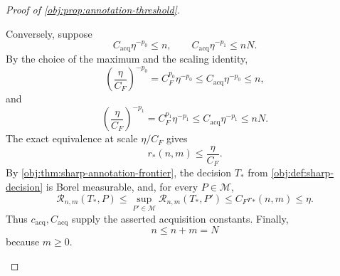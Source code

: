 \begin{proof}[Proof of \cref{obj:prop:annotation-threshold}]
\begin{enumerate}
Conversely, suppose
\[
C_{\mathrm{acq}}\eta^{-p_0}\le n,
\qquad
C_{\mathrm{acq}}\eta^{-p_1}\le nN.
\]
By the choice of the maximum and the scaling identity,
\[
\left(\frac{\eta}{C_F}\right)^{-p_0}
=C_F^{p_0}\eta^{-p_0}
\le C_{\mathrm{acq}}\eta^{-p_0}\le n,
\]
and
\[
\left(\frac{\eta}{C_F}\right)^{-p_1}
=C_F^{p_1}\eta^{-p_1}
\le C_{\mathrm{acq}}\eta^{-p_1}\le nN.
\]
The exact equivalence at scale \(\eta/C_F\) gives
\[
r_*(n,m)\le\frac{\eta}{C_F}.
\]
By \cref{obj:thm:sharp-annotation-frontier}, the decision \(T_*\) from
\cref{obj:def:sharp-decision} is Borel measurable, and, for every \(P\in\mathcal M\),
\[
\mathcal R_{n,m}(T_*,P)
\le\sup_{P'\in\mathcal M}\mathcal R_{n,m}(T_*,P')
\le C_F r_*(n,m)
\le\eta.
\]
Thus \(c_{\mathrm{acq}},C_{\mathrm{acq}}\) supply the asserted acquisition constants. Finally,
\[
n\le n+m=N
\]
because \(m\ge0\).
\end{enumerate}
\end{proof}
